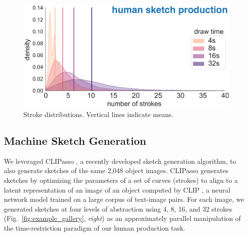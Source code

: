 \documentclass[10pt,letterpaper]{article}
\begin{document}
\begin{figure}[]
    \centering
    \includegraphics[width=.95\linewidth]{figures/VAB_stroke_complexity_v2.pdf}
        \vspace{-1em}
    \caption{Stroke distributions. Vertical lines indicate means.}
    \label{fig:stroke_counts}
    \vspace{-1.5em}
\end{figure}

\subsection{Machine Sketch Generation}
We leveraged CLIPasso \cite{vinker2022clipasso}, a recently developed sketch generation algorithm, to also generate sketches of the same 2,048 object images. 
CLIPasso generates sketches by optimizing the parameters of a set of curves (strokes) to align to a latent representation of an image of an object computed by CLIP \cite{radford2021learning}, a neural network model trained on a large corpus of text-image pairs.
For each image, we generated sketches at four levels of abstraction using 4, 8, 16, and 32 strokes (Fig.~\ref{fig:example_gallery}, \textit{right}) as an approximately parallel manipulation of the time-restriction paradigm of our human production task.
\end{document}

